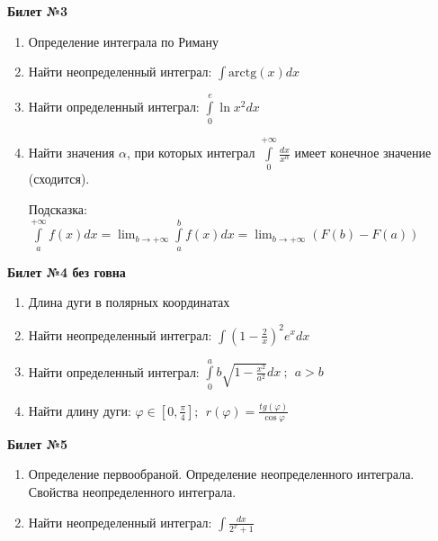 \documentclass[a4paper, 12pt]{article}
\begin{document}
\begin{center}
	\textbf{Билет №3}
\end{center}
\begin{enumerate}
	\item Определение интеграла по Риману
	\item Найти неопределенный интеграл: $\displaystyle \int{\text{arctg}(x)dx}$
	\item Найти определенный интеграл: $\displaystyle \int\limits_{0}^{e}{\ln{x^2}dx}$
	\item Найти значения $\alpha$, при которых интеграл $\displaystyle \int\limits_{0}^{+\infty}{\frac{dx}{x^{\alpha}}}$ имеет конечное значение (сходится).
	
	Подсказка: $\displaystyle \int\limits_{a}^{+\infty}{f(x)dx} = \lim_{b\to+\infty}{\int\limits_{a}^{b}{f(x)dx}} = \lim_{b\to+\infty}{\left(F(b) - F(a)\right)} $
	
\end{enumerate}
\newpage
\begin{center}
	\textbf{Билет №4 без говна}
\end{center}
\begin{enumerate}
	\item Длина дуги в полярных координатах
	\item Найти неопределенный интеграл: $\displaystyle \int{\left(1-\frac{2}{x}\right)^2 e^xdx}$
	\item Найти определенный интеграл: $\displaystyle \int\limits_{0}^{a}{b\sqrt{1 - \frac{x^2}{a^2}}dx} \ ; \ \ a > b$
	\item Найти длину дуги: $\displaystyle \varphi \in \left[0, \frac{\pi}{4}\right];\ \  r(\varphi) = \displaystyle \frac{tg(\varphi)}{\cos{\varphi}}$
	
\end{enumerate}

\begin{center}
	\textbf{Билет №5}
\end{center}
\begin{enumerate}
	\item Определение первообраной. Определение неопределенного интеграла. Свойства неопределенного интеграла.
	\item Найти неопределенный интеграл: $\displaystyle \int{\frac{dx}{2^x + 1}}$
\end{enumerate}
\end{document}
